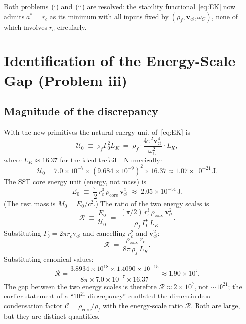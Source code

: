 \documentclass[11pt,a4paper]{article}
\newcommand{\rc}{r_c}
\newcommand{\vswirl}{\mathbf{v}_{\scriptscriptstyle\boldsymbol{\circlearrowleft}}}
\newcommand{\rhof}{\rho_{\!f}}
\newcommand{\rhocore}{\rho_{\!\mathrm{core}}}
\newcommand{\GammaZ}{\Gamma_0}
\newcommand{\omC}{\omega_C}
\begin{document}
Both problems~(i) and~(ii) are resolved:
the stability functional~\eqref{eq:EK} now admits
$a^*=\rc$ as its minimum with all inputs fixed by
$(\rhof,\vswirl,\omC)$, none of which involves $\rc$ circularly.

\section{Identification of the Energy-Scale Gap (Problem iii)}
\label{sec:gap}

\subsection{Magnitude of the discrepancy}

With the new primitives the natural energy unit of~\eqref{eq:EK} is
\begin{equation}
  \mathcal{U}_0
  \;\equiv\; \rhof\GammaZ^2 L_K
  \;=\; \rhof \cdot \frac{4\pi^2\vswirl^4}{\omC^2} \cdot L_K,
  \label{eq:U0}
\end{equation}
where $L_K\approx16.37$ for the ideal trefoil~\cite{Gilbert2016}.
Numerically:
\begin{equation}
  \mathcal{U}_0
  = 7.0\times10^{-7}
    \times(9.684\times10^{-9})^2
    \times16.37
  \approx 1.07\times10^{-21}\,\mathrm{J}.
\end{equation}
The SST core energy unit (energy, not mass) is
\begin{equation}
  E_0
  \;\equiv\; \frac{\pi}{2}\,\rc^3\,\rhocore\,\vswirl^2
  \;\approx\; 2.05\times10^{-14}\,\mathrm{J}.
  \label{eq:E0}
\end{equation}
(The rest mass is $M_0=E_0/c^2$.)  The ratio of the two energy scales is
\begin{equation}
  \mathcal{R}
  \;\equiv\; \frac{E_0}{\mathcal{U}_0}
  \;=\; \frac{(\pi/2)\,\rc^3\,\rhocore\,\vswirl^2}
             {\rhof\,\GammaZ^2\,L_K}.
  \label{eq:ratio_def}
\end{equation}
Substituting $\GammaZ=2\pi\rc\vswirl$ and cancelling $\rc^2$ and
$\vswirl^2$:
\begin{equation}
  \mathcal{R}
  \;=\; \frac{\rhocore\,\rc}{8\pi\,\rhof\,L_K}.
  \label{eq:ratio}
\end{equation}
Substituting canonical values:
\begin{equation}
  \mathcal{R}
  = \frac{3.8934\times10^{18}
          \times1.4090\times10^{-15}}
         {8\pi\times7.0\times10^{-7}\times16.37}
  \approx 1.90\times10^{7}.
  \label{eq:ratio_numerical}
\end{equation}
The gap between the two energy scales is therefore
$\mathcal{R}\approx2\times10^7$, not $\sim10^{21}$; the earlier
statement of a ``$10^{21}$ discrepancy'' conflated the dimensionless
condensation factor $\mathcal{C}=\rhocore/\rhof$ with the
energy-scale ratio $\mathcal{R}$.  Both are large, but they are
distinct quantities.
\end{document}
